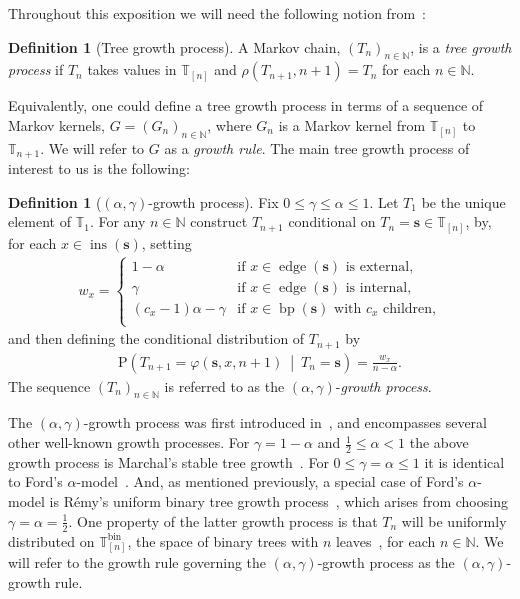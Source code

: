 \documentclass[a4paper, final]{amsart}
\theoremstyle{plain}
\theoremstyle{definition}
\newtheorem{defi}[thm]{Definition}
\newcommand{\tree}[1][t]{\boldsymbol{#1}}
\newcommand{\T}{\mathbb{T}}
\DeclareMathOperator{\edge}{edge}
\DeclareMathOperator{\insertable}{ins}
\DeclareMathOperator{\branchpoints}{bp}
\DeclareMathOperator{\bin}{bin}
\newcommand{\insertablef}[1][\tree]{\insertable({\tree[#1]})}
\newcommand{\nin}{{n \in \mathbb{N}}}
\renewcommand{\P}{\mathrm{P}}
\begin{document}
Throughout this exposition we will need the following notion from~\cite{RefWorks:doc:5b6c5580e4b0a3935d3436d8}:
%
\begin{defi}[Tree growth process]\label{def:growthprocess}
  A Markov chain, ${\left( T_n \right)}_\nin$, is a \textit{tree growth process} if $T_n$ takes values in $\T_{[n]}$ and $\rho \left( T_{n+1}, n+1 \right) = T_n$ for each $\nin$. 
\end{defi}
%
Equivalently, one could define a tree growth process in terms of a sequence of Markov kernels, $G = {\left( G_n \right)}_\nin$, where $G_n$ is a Markov kernel from $\T_{[n]}$ to $\T_{n+1}$.
We will refer to $G$ as a \textit{growth rule}.
The main tree growth process of interest to us is the following:
%
\begin{defi}[$(\alpha, \gamma)$-growth process]\label{def:growthprocess_alphagamma}
  Fix $0 \leq \gamma \leq \alpha \leq 1$.
  Let $T_1$ be the unique element of $\T_1$.
  For any $\nin$ construct $T_{n+1}$ conditional on $T_n = \tree[s] \in \T_{[n]}$, by, for each $x \in \insertablef[s]$, setting
  \begin{align*}
    w_x
    = 
    \begin{cases}
      1 - \alpha & \text{if $x \in \edge \left( \tree[s] \right)$ is external,} \\
      \gamma & \text{if $x \in \edge \left( \tree[s] \right)$ is internal,} \\
      \left( c_x - 1 \right) \alpha - \gamma & \text{if $x \in \branchpoints (\tree[s])$ with $c_x$ children,} \\
    \end{cases}
  \end{align*}
  and then defining the conditional distribution of $T_{n+1}$ by
  \begin{align*}
    \P \left( T_{n+1} = \varphi \left( \tree[s], x, n+1 \right) \ \middle \vert \ T_n = \tree[s] \right)
    = \frac{w_x}{n - \alpha}. 
  \end{align*}
  The sequence ${\left( T_n \right)}_\nin$ is referred to as the $(\alpha, \gamma)$-\textit{growth process}.
\end{defi}
%
The $(\alpha, \gamma)$-growth process was first introduced in~\cite{RefWorks:doc:5b4cbb5fe4b02dc0c79270af}, and encompasses several other well-known growth processes.
For $\gamma = 1-\alpha$ and $\frac{1}{2} \leq \alpha < 1$ the above growth process is Marchal's stable tree growth~\cite{RefWorks:doc:5b6c561fe4b06c0731a5c558}.
For $0 \leq \gamma = \alpha \leq 1$ it is identical to Ford's $\alpha$-model~\cite{RefWorks:doc:5b76ce32e4b0820c421f301d}.
And, as mentioned previously, a special case of Ford's $\alpha$-model is R\'{e}my's uniform binary tree growth process~\cite{RefWorks:doc:5b71b380e4b06c0731a629f4}, which arises from choosing $\gamma = \alpha = \frac{1}{2}$.
One property of the latter growth process is that $T_n$ will be uniformly distributed on $\T_{[n]}^{\bin}$, the space of binary trees with $n$ leaves~\cite{RefWorks:doc:5b4cbc14e4b04428cc72cf41}, for each $\nin$.
We will refer to the growth rule governing the $(\alpha, \gamma)$-growth process as the $(\alpha, \gamma)$-growth rule.
\end{document}
